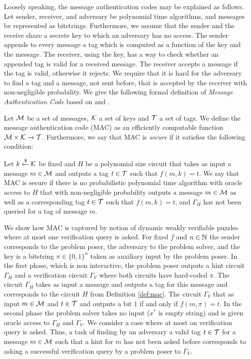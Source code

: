 Loosely speaking, the message authentication codes may be explained as follows.
Let sender, receiver, and adversary be polynomial time algorithms, and messages be represented as bitstrings.
Furthermore, we assume that the sender and the receive share a secrete key to which an adversary has no access.
The sender appends to every message a tag which is computed as a function of the key and the message.
The receiver, using the key, has a way to check whether an appended tag is valid for a received message.
The receiver accepts a message if the tag is valid, otherwise it rejects.
We require that it is hard for the adversary to find a tag and a message, not sent before, that is accepted by the receiver with non-negligible probability.
We give the following formal definition of \textit{Message Authentication Code} based on \cite{LectureNotesCrypo} and \cite{Goldreich:2004:FCV:975541}.
\begin{definition}
  \label{def:mac}
  Let $\mathcal{M}$ be a set of messages, $\mathcal{K}$ a set of keys and $\mathcal{T}$ a set of tags.
  We define the \textnormal{message authentication code (MAC)} as an efficiently computable function $\mathcal{M} \times \mathcal{K} \rightarrow \mathcal{T}$.
  Furthermore, we say that MAC is \textit{secure} if it satisfies the following condition:

  Let $k \xleftarrow{\$} \mathcal{K}$ be fixed and $H$ be a polynomial size circuit that takes as input a message $m \in \mathcal{M}$ and outputs a tag $t \in \mathcal{T}$
  such that $f(m,k) = t$. We say that MAC is secure if there is no probabilistic polynomial time algorithm
  with oracle access to $H$ that with non-negligible probability outputs a message $m \in \mathcal{M}$
  as well as a corresponding tag $t \in \mathcal{T}$ such that $f(m, k) = t$, and $\Gamma_H$ has not been queried for a tag of message $m$.
\end{definition}
%
We show how MAC is captured by notion of dynamic weakly verifiable puzzles where at most one verification query is asked.
For fixed $f$ and $n \in \mathbb{N}$ the sender corresponds to the problem poser, the adversary to the problem solver,
and the key is a bitstring $\pi \in \{0,1\}^{n}$ taken as auxiliary input by the problem poser.
In the first phase, which is non interactive, the problem poser outputs a hint circuit
$\Gamma_H$ and a verification circuit $\Gamma_V$ where both circuits have hard-coded $\pi$.
The circuit $\Gamma_H$ takes as input a message and outputs a tag for this message and corresponds to the circuit $H$ from Definition \ref{def:mac}.
The circuit $\Gamma_V$ that as input $m \in \mathcal{M}$ and $t \in \mathcal{T}$ and outputs a bit $1$ if and only if $f(m, \pi) = t$.
In the second phase the problem solver takes no input ($x^*$ is empty string) and is given oracle access to $\Gamma_H$ and $\Gamma_V$.
We consider a case where at most on verification query is asked.
Thus, a task of finding by an adversary a valid tag $t \in \mathcal{T}$ for a message $m \in \mathcal{M}$ such that a hint for $m$ has not been asked before
corresponds to asking a successful verification query by a problem poser to $\Gamma_V$.
%
